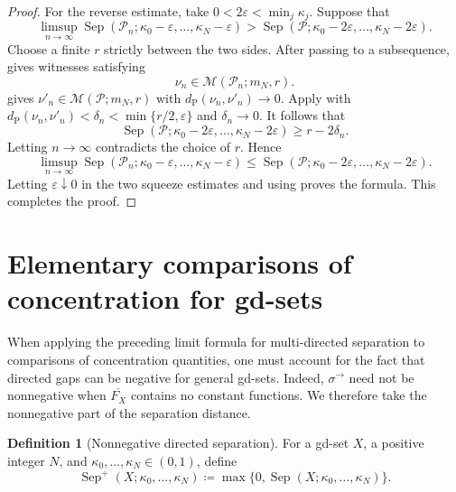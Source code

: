 \documentclass{amsart}
\theoremstyle{plain}
\theoremstyle{definition}
\newtheorem{definition}[theorem]{Definition}
\theoremstyle{remark}
\newcommand{\M}{\mathcal{M}}
\newcommand{\dpr}{d_{\operatorname{P}}}
\begin{document}
\begin{proof}
For the reverse estimate, take $0<2\varepsilon<\min_j\kappa_j$.  Suppose that
\[
\limsup_{n\to\infty}
\operatorname{Sep}(\mathcal P_n;\kappa_0-\varepsilon,\ldots,
\kappa_N-\varepsilon)
>\operatorname{Sep}(\mathcal P;\kappa_0-2\varepsilon,\ldots,
\kappa_N-2\varepsilon).
\]
Choose a finite $r$ strictly between the two sides.  After passing to a
subsequence,  gives
witnesses satisfying
\[\nu_n\in\M(\mathcal P_n;m_N,r).\]
 gives
$\nu'_n\in\M(\mathcal P;m_N,r)$ with $\dpr(\nu_n,\nu'_n)\to0$.  Apply
 with
$\dpr(\nu_n,\nu'_n)<\delta_n<\min\{r/2,\varepsilon\}$ and
$\delta_n\to0$.  It follows that
\[
\operatorname{Sep}(\mathcal P;\kappa_0-2\varepsilon,\ldots,
\kappa_N-2\varepsilon)\geq r-2\delta_n.
\]
Letting $n\to\infty$ contradicts the choice of $r$.  Hence
\begin{equation}
\label{eq:multi-directed-separation-limit-upper-squeeze}
\limsup_{n\to\infty}
\operatorname{Sep}(\mathcal P_n;\kappa_0-\varepsilon,\ldots,
\kappa_N-\varepsilon)
\leq\operatorname{Sep}(\mathcal P;\kappa_0-2\varepsilon,\ldots,
\kappa_N-2\varepsilon).
\end{equation}
Letting $\varepsilon\downarrow0$ in the two squeeze estimates and using
 proves the
formula.  This completes the proof.
\end{proof}

\section{Elementary comparisons of concentration for gd-sets}
\label{sec:one-sided-concentration}

When applying the preceding limit formula for multi-directed separation to
comparisons of concentration quantities, one must account for the fact that
directed gaps can be negative for general gd-sets.  Indeed,
$\sigma^\to$ need not be nonnegative when $\overline{F_X}$ contains no
constant functions.  We therefore take the nonnegative part of the
separation distance.

\begin{definition}[Nonnegative directed separation]
\label{def:nonnegative-multi-directed-separation}
For a gd-set $X$, a positive integer $N$, and
$\kappa_0,\ldots,\kappa_N\in(0,1)$, define
\[
\operatorname{Sep}^+(X;\kappa_0,\ldots,\kappa_N)
\coloneqq\max\{0,\operatorname{Sep}(X;\kappa_0,\ldots,\kappa_N)\}.
\]
\end{definition}
\end{document}
